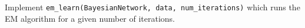 \item {}

Implement \texttt{em\_learn(BayesianNetwork, data, num\_iterations)} which runs the EM algorithm for a given number of iterations.

